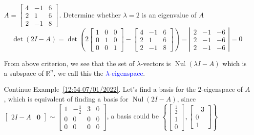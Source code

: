 \documentclass{beamer}
\DeclareMathOperator{\Nul}{Nul}
\theoremstyle{definition}
\theoremstyle{remark}
\begin{document}
\begin{frame}[t]
\begin{example}\label{12:54-07/01/2022}
$A=\begin{bmatrix}
4&-1&6\\
2&1&6\\
2&-1&8
\end{bmatrix}$. Determine whether $\lambda=2$ is an eigenvalue of $A$\pause
\[
\det(2I-A)=\det\left(2\begin{bmatrix}
1&0&0\\
0&1&0\\
0&0&1
\end{bmatrix}-\begin{bmatrix}
4&-1&6\\
2&1&6\\
2&-1&8
\end{bmatrix}\right)=\left|\begin{matrix}
2&-1&-6\\
2&-1&-6\\
2&-1&-6
\end{matrix}\right|=0
\]
\end{example}
\end{frame}

\begin{frame}[t]
\begin{definition}
From above criterion, we see that the set of $\lambda$-vectors is $\Nul(\lambda I-A)$ which is a subspace of $\mathbb R^n$, we call this the \textcolor{blue}{$\lambda$-eigenspace}.
\end{definition}
\pause
\begin{example}
Continue Example~\ref{12:54-07/01/2022}. Let's find a basis for the $2$-eigenspace of $A$\pause, which is equivalent of finding a basis for $\Nul(2I-A)$, since\pause $\left[\begin{array}{c|c}
2I-A&\mathbf 0
\end{array}\right]\sim\left[\begin{array}{ccc|c}
1&-\frac{1}{2}&3&0\\
0&0&0&0\\
0&0&0&0
\end{array}\right]$, a basis could be $\left\{\begin{bmatrix}
\frac{1}{2}\\1\\0
\end{bmatrix},\begin{bmatrix}
-3\\0\\1
\end{bmatrix}\right\}$
\end{example}
\end{frame}
\end{document}
